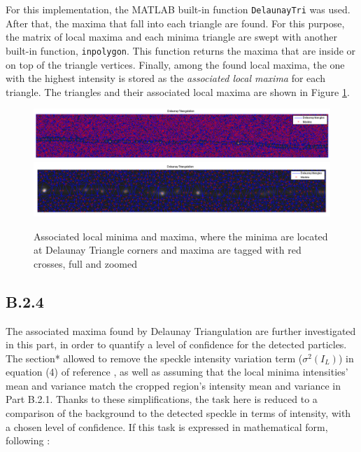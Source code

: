 \documentclass{article}
\begin{document}
For this implementation, the MATLAB built-in function \texttt{DelaunayTri} was used. After that, the maxima that fall into each triangle are found. For this purpose, the matrix of local maxima and each minima triangle are swept with another built-in function, \texttt{inpolygon}. This function returns the maxima that are inside or on top of the triangle vertices. Finally, among the found local maxima, the one with the highest intensity is stored as the \emph{associated local maxima} for each triangle. The triangles and their associated local maxima are shown in Figure \ref{fig:assocLocal}.

\begin{figure}[H]
\centering
\includegraphics[width=16cm]{figures/delaunay_full.png}
\includegraphics[width=16cm]{figures/delaunay_zoom.png}
\caption{Associated local minima and maxima, where the minima are located at Delaunay Triangle corners and maxima are tagged with red crosses, full and zoomed}
\label{fig:assocLocal}
\end{figure}



\subsection*{B.2.4}
 
The associated maxima found by Delaunay Triangulation are further investigated in this part, in order to quantify a level of confidence for the detected particles. The section* allowed to remove the speckle intensity variation term ($\sigma^2(I_L)$) in equation (4) of reference \cite{ponti}, as well as assuming that the local minima intensities' mean and variance match the cropped region's intensity mean and variance in Part B.2.1. Thanks to these simplifications, the task here is reduced to a comparison of the background to the detected speckle in terms of intensity, with a chosen level of confidence. If this task is expressed in mathematical form, following \cite{ponti}:
\end{document}

